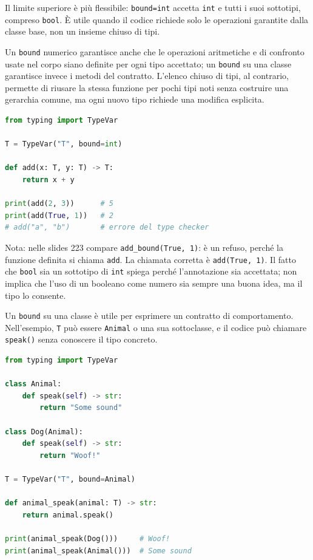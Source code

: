 \documentclass[12pt]{extarticle}
\begin{document}
\noindent Il limite superiore è più flessibile: \texttt{bound=int} accetta \texttt{int} e tutti i suoi sottotipi, compreso \texttt{bool}. È utile quando il codice richiede solo le operazioni garantite dalla classe base, non un insieme chiuso di tipi.

\noindent Un \texttt{bound} numerico garantisce anche che le operazioni aritmetiche e di confronto usate nel corpo siano definite per ogni tipo accettato; un \texttt{bound} su una classe garantisce invece i metodi del contratto. L'elenco chiuso di tipi, al contrario, permette di riusare la stessa funzione per pochi tipi noti senza costruire una gerarchia comune, ma ogni nuovo tipo richiede una modifica esplicita.

\begin{lstlisting}[language=Python]
from typing import TypeVar

T = TypeVar("T", bound=int)

def add(x: T, y: T) -> T:
    return x + y

print(add(2, 3))      # 5
print(add(True, 1))   # 2
# add("a", "b")       # errore del type checker
\end{lstlisting}

\noindent Nota: nelle slides 223 compare \texttt{add\_bound(True, 1)}: è un refuso, perché la funzione definita si chiama \texttt{add}. La chiamata corretta è \texttt{add(True, 1)}. Il fatto che \texttt{bool} sia un sottotipo di \texttt{int} spiega perché l'annotazione sia accettata; non implica che l'uso di un booleano come numero sia sempre una buona idea, ma il tipo lo consente.

\noindent Un \texttt{bound} su una classe è utile per esprimere un contratto di comportamento. Nell'esempio, \texttt{T} può essere \texttt{Animal} o una sua sottoclasse, e il codice può chiamare \texttt{speak()} senza conoscere il tipo concreto.

\begin{lstlisting}[language=Python]
from typing import TypeVar

class Animal:
    def speak(self) -> str:
        return "Some sound"

class Dog(Animal):
    def speak(self) -> str:
        return "Woof!"

T = TypeVar("T", bound=Animal)

def animal_speak(animal: T) -> str:
    return animal.speak()

print(animal_speak(Dog()))     # Woof!
print(animal_speak(Animal()))  # Some sound
\end{lstlisting}
\end{document}
